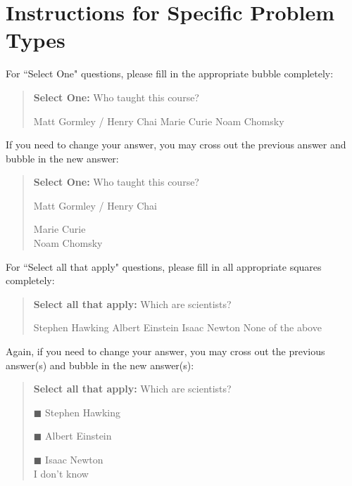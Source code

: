 \documentclass[11pt,addpoints,answers]{exam}
\numberwithin{equation}{section} %
\numberwithin{figure}{section} %
\numberwithin{table}{section} %
\begin{document}
\clearpage
\section*{Instructions for Specific Problem Types}

For ``Select One" questions, please fill in the appropriate bubble completely:

\begin{quote}
\textbf{Select One:} Who taught this course?
     \begin{checkboxes}
     \CorrectChoice Matt Gormley / Henry Chai
     \choice Marie Curie
     \choice Noam Chomsky
    \end{checkboxes}
\end{quote}

If you need to change your answer, you may cross out the previous answer and bubble in the new answer:

\begin{quote}
\textbf{Select One:} Who taught this course?
\begin{list}{}
     \item\CIRCLE{} Matt Gormley / Henry Chai
     \item\Circle{} Marie Curie\\
     \xcancel{\CIRCLE}{} Noam Chomsky
\end{list}
\end{quote}


For ``Select all that apply" questions, please fill in all appropriate squares completely:

\begin{quote}
\textbf{Select all that apply:} Which are scientists?
{
    \checkboxchar{$\Box$} \checkedchar{$\blacksquare$}
    \begin{checkboxes}
     \choice Stephen Hawking 
     \CorrectChoice Albert Einstein
     \choice Isaac Newton
     \choice None of the above
    \end{checkboxes}
    }
\end{quote}

Again, if you need to change your answer, you may cross out the previous answer(s) and bubble in the new answer(s):

\begin{quote}
\textbf{Select all that apply:} Which are scientists?
    \begin{list}{}
    \item $\blacksquare$ Stephen Hawking 
    \item $\blacksquare$ Albert Einstein
    \item $\blacksquare$ Isaac Newton\\
    \xcancel{$\blacksquare$} I don't know
\end{list}
\end{quote}
\end{document}
